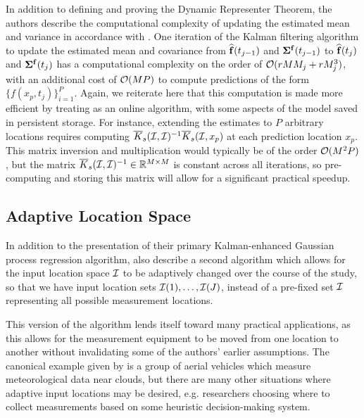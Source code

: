 \documentclass[10pt]{article}
\numberwithin{equation}{section}
\begin{document}
In addition to defining and proving the Dynamic Representer Theorem, the authors describe the computational complexity of updating the estimated mean and variance in accordance with . One iteration of the Kalman filtering algorithm to update the estimated mean and covariance from $\widehat{\mathbf{f}}(t_{j-1})$ and $\bm{\Sigma}^{\mathbf{f}}(t_{j-1})$ to $\widehat{\mathbf{f}}(t_{j})$ and $\bm{\Sigma}^{\mathbf{f}}(t_{j})$ has a computational complexity on the order of $\mathcal{O}(rMM_{j} + rM_{j}^{3})$, with an additional cost of $\mathcal{O}(MP)$ to compute predictions of the form $\{f(x_{p}, t_{j})\}_{i=1}^{P}$. Again, we reiterate here that this computation is made more efficient by treating  as an online algorithm, with some aspects of the model saved in persistent storage. For instance, extending the estimates to $P$ arbitrary locations requires computing $\overline{K}_{s}(\mathcal{I}, \mathcal{I})^{-1}\overline{K}_{s}(\mathcal{I}, x_{p})$ at each prediction location $x_{p}$. This matrix inversion and multiplication would typically be of the order $\mathcal{O}(M^{2}P)$, but the matrix $\overline{K}_{s}(\mathcal{I}, \mathcal{I})^{-1} \in \mathbb{R}^{M \times M}$ is constant across all iterations, so pre-computing and storing this matrix will allow for a significant practical speedup.


\subsection{Adaptive Location Space}

In addition to the presentation of their primary Kalman-enhanced Gaussian process regression algorithm, \citeauthor{Todescato-Efficient-2020} also describe a second algorithm which allows for the input location space $\mathcal{I}$ to be adaptively changed over the course of the study, so that we have input location sets $\mathcal{I}(1), \dots, \mathcal{I}(J)$, instead of a pre-fixed set $\mathcal{I}$ representing all possible measurement locations.

This version of the algorithm lends itself toward many practical applications, as this allows for the measurement equipment to be moved from one location to another without invalidating some of the authors' earlier assumptions. The canonical example given by \citeauthor{Todescato-Efficient-2020} is a group of aerial vehicles which measure meteorological data near clouds, but there are many other situations where adaptive input locations may be desired, e.g. researchers choosing where to collect measurements based on some heuristic decision-making system. 
\end{document}
